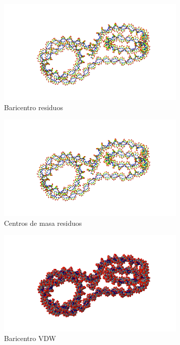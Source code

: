 \begin{figure}
\centering
\begin{subfigure}{.4\textwidth}
  \centering
  \includegraphics[width=.78\linewidth]{./Figures/baresi.png}
  \caption{Baricentro residuos }
  \label{fig:sub11}
\end{subfigure}%
\begin{subfigure}{.4\textwidth}
  \centering
  \includegraphics[width=.78\linewidth]{./Figures/baresi.png}
  \caption{Centros de masa residuos}
  \label{fig:sub22}
\end{subfigure}
\begin{subfigure}{.4\textwidth}
  \centering
  \includegraphics[width=.78\linewidth]{./Figures/bavdw.png}
  \caption{Baricentro VDW}
  \label{fig:sub33}
\end{subfigure}%
\begin{subfigure}{.4\textwidth}

\end{subfigure}
\end{figure}
